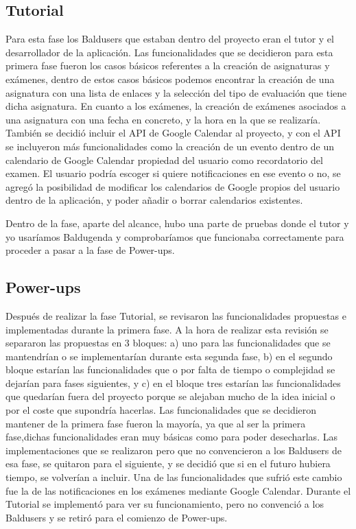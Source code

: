\subsection{Tutorial}
\label{subsecc:Tutorial}

Para esta fase los Baldusers que estaban dentro del proyecto eran el tutor y el desarrollador de la aplicación. Las funcionalidades que se decidieron para esta primera fase fueron los casos básicos referentes a la creación de asignaturas y exámenes, dentro de estos casos básicos podemos encontrar la creación de una asignatura con una lista de enlaces y la selección del tipo de evaluación que tiene dicha asignatura. En cuanto a los exámenes, la creación de exámenes asociados a una asignatura con una fecha en concreto, y la hora en la que se realizaría.
También se decidió incluir el API de Google Calendar al proyecto, y con el API se incluyeron más funcionalidades como la creación de un evento dentro de un calendario de Google Calendar propiedad del usuario como recordatorio del examen. El usuario podría escoger si quiere notificaciones en ese evento o no, se agregó la  posibilidad de modificar los calendarios de Google propios del usuario dentro de la aplicación, y poder añadir o borrar calendarios existentes.
 
Dentro de la fase, aparte del alcance, hubo una parte de pruebas donde el tutor y yo usaríamos Baldugenda y comprobaríamos que funcionaba correctamente para proceder a pasar a la fase de Power-ups.
\newpage

\subsection{Power-ups}
\label{subsecc:Powerups}

Después de realizar la fase Tutorial, se revisaron las funcionalidades propuestas e implementadas durante la primera fase. A la hora de realizar esta revisión se separaron las propuestas en 3 bloques: a) uno para las funcionalidades que se mantendrían o se implementarían durante esta segunda fase, b) en el segundo bloque estarían las funcionalidades que o por falta de tiempo o complejidad se dejarían para fases siguientes, y c) en el bloque tres estarían las funcionalidades que quedarían fuera del proyecto porque se alejaban mucho de la idea inicial o por el coste que supondría hacerlas.
Las funcionalidades que se decidieron mantener de la primera fase fueron la mayoría, ya que al ser la primera fase,dichas funcionalidades eran  muy básicas como para poder desecharlas. Las implementaciones que se realizaron pero que no convencieron a los Baldusers de esa fase, se quitaron para el siguiente, y se decidió que si en el futuro hubiera tiempo, se volverían a incluir. Una de las funcionalidades que sufrió este cambio fue la de las notificaciones en los exámenes mediante Google Calendar. Durante el Tutorial se implementó para ver su funcionamiento, pero no convenció a los Baldusers y se retiró para el comienzo de Power-ups.

